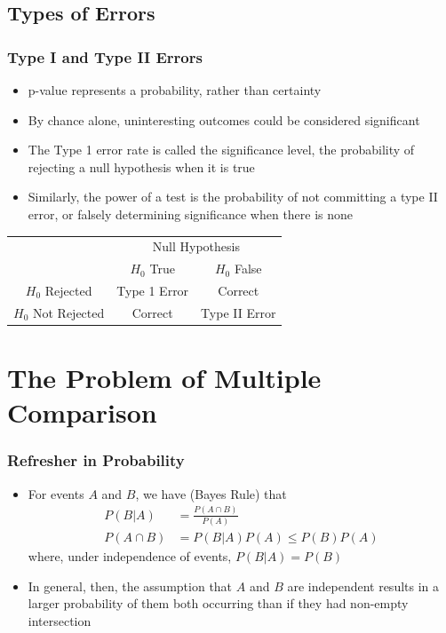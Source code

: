 \documentclass[11pt]{beamer}
\begin{document}
\subsection{Types of Errors}

\begin{frame}
\frametitle{Type I and Type II Errors}

\begin{itemize}
\item p-value represents a probability, rather than certainty \\
\item By chance alone, uninteresting outcomes could be considered significant \\
\item The Type 1 error rate is called the significance level, the probability of rejecting a null hypothesis when it is true \\
\item Similarly, the power of a test is the probability of not committing a type II error, or falsely determining significance when there is none
\end{itemize}

\begin{center}
\begin{tabular}{c| c c }
\hline
& \multicolumn{2}{c}{Null Hypothesis} \\[3pt]
& $H_0$ True & $H_0$ False \\
\hline 
$H_0$ Rejected & Type 1 Error & Correct  \\[2pt]
$H_0$ Not Rejected & Correct & Type II Error \\[1pt]
\hline
\end{tabular}
\end{center}
\end{frame}

\section{The Problem of Multiple Comparison}

\begin{frame}
\frametitle{Refresher in Probability}
{
\begin{itemize}
\item For events $A$ and $B$, we have (Bayes Rule) that
\begin{align*}
P(B|A) &= \frac{P(A \cap B)}{P(A)} \\[6pt]
P(A \cap B) &= P(B|A)P(A) \leq P(B)P(A)
\end{align*}
where, under independence of events, $P(B|A) = P(B)$ \\
\item In general, then, the assumption that $A$ and $B$ are independent results in a larger probability of them both occurring than if they had non-empty intersection
\end{itemize}
}
\end{frame}
\end{document}
